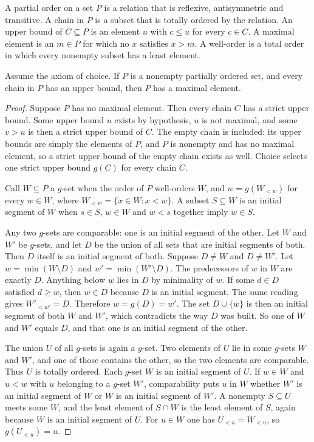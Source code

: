 \begin{definition}
A partial order on a set $P$ is a relation that is reflexive, antisymmetric and transitive. A chain in $P$ is a subset that is totally ordered by the relation. An upper bound of $C\subseteq P$ is an element $u$ with $c\le u$ for every $c\in C$. A maximal element is an $m\in P$ for which no $x$ satisfies $x>m$. A well-order is a total order in which every nonempty subset has a least element.
\end{definition}

\begin{theorem}\label{thm:zorn}
Assume the axiom of choice. If $P$ is a nonempty partially ordered set, and every chain in $P$ has an upper bound, then $P$ has a maximal element.
\end{theorem}
\begin{proof}
Suppose $P$ has no maximal element. Then every chain $C$ has a strict upper bound. Some upper bound $u$ exists by hypothesis, $u$ is not maximal, and some $v>u$ is then a strict upper bound of $C$. The empty chain is included: its upper bounds are simply the elements of $P$, and $P$ is nonempty and has no maximal element, so a strict upper bound of the empty chain exists as well. Choice selects one strict upper bound $g(C)$ for every chain $C$.

Call $W\subseteq P$ a $g$-set when the order of $P$ well-orders $W$, and $w=g(W_{<w})$ for every $w\in W$, where $W_{<w}=\{x\in W:x<w\}$. A subset $S\subseteq W$ is an initial segment of $W$ when $s\in S$, $w\in W$ and $w<s$ together imply $w\in S$.

Any two $g$-sets are comparable: one is an initial segment of the other. Let $W$ and $W'$ be $g$-sets, and let $D$ be the union of all sets that are initial segments of both. Then $D$ itself is an initial segment of both. Suppose $D\ne W$ and $D\ne W'$. Let $w=\min(W\setminus D)$ and $w'=\min(W'\setminus D)$. The predecessors of $w$ in $W$ are exactly $D$. Anything below $w$ lies in $D$ by minimality of $w$. If some $d\in D$ satisfied $d\ge w$, then $w\in D$ because $D$ is an initial segment. The same reading gives $W'_{<w'}=D$. Therefore $w=g(D)=w'$. The set $D\cup\{w\}$ is then an initial segment of both $W$ and $W'$, which contradicts the way $D$ was built. So one of $W$ and $W'$ equals $D$, and that one is an initial segment of the other.

The union $U$ of all $g$-sets is again a $g$-set. Two elements of $U$ lie in some $g$-sets $W$ and $W'$, and one of those contains the other, so the two elements are comparable. Thus $U$ is totally ordered. Each $g$-set $W$ is an initial segment of $U$. If $w\in W$ and $u<w$ with $u$ belonging to a $g$-set $W'$, comparability puts $u$ in $W$ whether $W'$ is an initial segment of $W$ or $W$ is an initial segment of $W'$. A nonempty $S\subseteq U$ meets some $W$, and the least element of $S\cap W$ is the least element of $S$, again because $W$ is an initial segment of $U$. For $u\in W$ one has $U_{<u}=W_{<u}$, so $g(U_{<u})=u$.


\end{proof}
